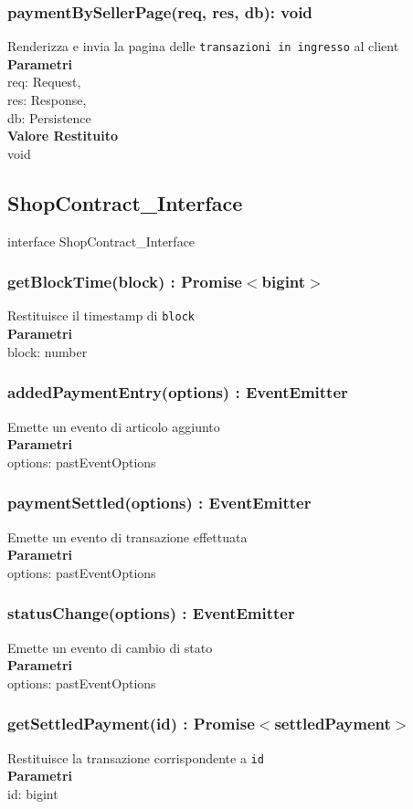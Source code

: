 \documentclass[a4paper, 12pt]{article}
\begin{document}
\subsubsection{paymentBySellerPage(req, res, db): void}
Renderizza e invia la pagina delle \texttt{transazioni in ingresso} al client\\
\textbf{Parametri}\\
req: Request,\\
res: Response,\\
db: Persistence\\
\textbf{Valore Restituito}\\
void

\subsection{ShopContract\_Interface}
interface ShopContract\_Interface
\subsubsection{getBlockTime(block) : Promise$<$bigint$>$}
Restituisce il timestamp di \texttt{block}\\
\textbf{Parametri}\\
block: number\\
\subsubsection{addedPaymentEntry(options) : EventEmitter}
Emette un evento di articolo aggiunto\\
\textbf{Parametri}\\
options: pastEventOptions
\subsubsection{paymentSettled(options) : EventEmitter}
Emette un evento di transazione effettuata\\
\textbf{Parametri}\\
options: pastEventOptions
\subsubsection{statusChange(options) : EventEmitter}
Emette un evento di cambio di stato\\
\textbf{Parametri}\\
options: pastEventOptions
\subsubsection{getSettledPayment(id) : Promise$<$settledPayment$>$}
Restituisce la transazione corrispondente a \texttt{id}\\
\textbf{Parametri}\\
id: bigint
\end{document}

